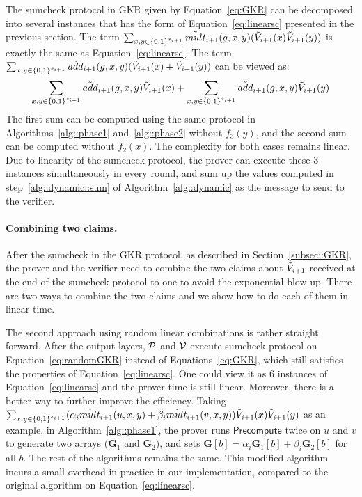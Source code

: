 The sumcheck protocol in GKR given by Equation~\ref{eq:GKR} can be decomposed into several instances that has the form of Equation~\ref{eq:linearsc} presented in the previous section. The term $\sum_{x,y\in\binary^{s_{i+1}}}\tmult_{i+1}(g,x,y)(\tV_{i+1}(x)\tV_{i+1}(y))$ is exactly the same as Equation~\ref{eq:linearsc}.  The term $\sum_{x,y\in\binary^{s_{i+1}}}\tadd_{i+1}(g,x,y)(\tV_{i+1}(x)+\tV_{i+1}(y))$ can be viewed as: 
\[
\sum_{x,y\in\binary^{s_{i+1}}}\tadd_{i+1}(g,x,y)\tV_{i+1}(x)+\sum_{x,y\in\binary^{s_{i+1}}}\tadd_{i+1}(g,x,y)\tV_{i+1}(y)
\]
The first sum can be computed using the same protocol in Algorithms~\ref{alg::phase1} and~\ref{alg::phase2} without $f_3(y)$, and the second sum can be computed without $f_2(x)$. The complexity for both cases remains linear. Due to linearity of the sumcheck protocol, the prover can execute these 3 instances simultaneously in every round, and sum up the values computed in step~\ref{alg::dynamic::sum} of Algorithm~\ref{alg::dynamic} as the message to send to the verifier.



\paragraph{Combining two claims.} After the sumcheck in the GKR protocol, as described in Section~\ref{subsec::GKR}, the prover and the verifier need to combine the two claims about $\tV_{i+1}$ received at the end of the sumcheck protocol to one to avoid the exponential blow-up. There are two ways to combine the two claims and we show how to do each of them in linear time. 

The second approach using random linear combinations is rather straight forward. After the output layers, $\P$ and $\V$ execute sumcheck protocol on Equation~\ref{eq:randomGKR} instead of Equations~\ref{eq:GKR}, which still satisfies the properties of Equation~\ref{eq:linearsc}. One could view it as 6 instances of Equation~\ref{eq:linearsc} and the prover time is still linear. Moreover, there is a better way to further improve the efficiency. Taking $\sum_{x, y \in\binary^{s_{i+1}}}(\alpha_i\tmult_{i+1}(u,x,y)+\beta_i\tmult_{i+1}(v,x,y))\tV_{i+1}(x)\tV_{i+1}(y)$ as an example, in Algorithm~\ref{alg::phase1}, the prover runs $\mathsf{Precompute}$ twice on $u$ and $v$ to generate two arrays ($\textbf{G}_1$ and $\textbf{G}_2$), and sets $\textbf{G}[b]=\alpha_i \textbf{G}_1[b] + \beta_i\textbf{G}_2[b]$ for all $b$. The rest of the algorithms remains the same. This modified algorithm incurs a small overhead in practice in our implementation, compared to the original algorithm on Equation~\ref{eq:linearsc}.

